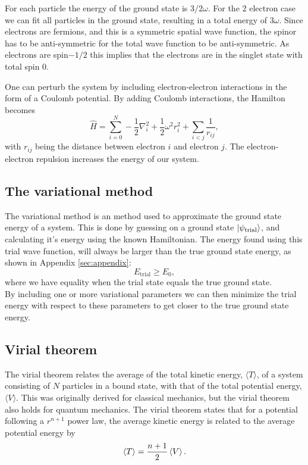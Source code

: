 \documentclass[%
 reprint,
nofootinbib,
aps,
]{revtex4-1}
\begin{document}
For each particle the energy of the ground state is $3/2\omega$. For the $2$ electron case we can fit all particles in the ground state, resulting in a total energy of $3\omega$. Since electrons are fermions, and this is a symmetric spatial wave function, the spinor has to be anti-symmetric for the total wave function to be anti-symmetric. As electrons are spin$-1/2$ this implies that the electrons are in the singlet state with total spin $0$.

One can perturb the system by including electron-electron interactions in the form of a Coulomb potential. By adding Coulomb interactions, the Hamilton becomes
\begin{equation}
  \hat{H} = \sum_{i=0}^{N} -\frac{1}{2}\nabla_i^2 + \frac{1}{2}\omega^2 r_i^2 + \sum_{i<j}\frac{1}{r_{ij}}, \label{hamil_interact}
\end{equation}
with $r_{ij}$ being the distance between electron $i$ and electron $j$. The electron-electron repulsion increases the energy of our system.


\subsection{The variational method}
The variational method is an method used to approximate the ground state energy of a system. This is done by guessing on a ground state $\ket{\psi_{\mathrm{trial}}}$, and calculating it's energy using the known Hamiltonian. The energy found using this trial wave function, will always be larger than the true ground state energy, as shown in Appendix \vref{sec:appendix}:
\begin{equation}\label{eq:variational_method}
  E_{\mathrm{trial}} \geq E_0,
\end{equation}
where we have equality when the trial state equals the true ground state.\\
By including one or more variational parameters we can then minimize the trial energy with respect to these parameters to get closer to the true ground state energy.

\subsection{Virial theorem}\label{sec:virial}
The virial theorem relates the average of the total kinetic energy, $\langle T \rangle$, of a system consisting of $N$ particles in a bound state, with that of the total potential energy, $\langle V \rangle$. This was originally derived for classical mechanics, but the virial theorem also holds for quantum mechanics. The virial theorem states that for a potential following a $r^{n+1}$ power law, the average kinetic energy is related to the average potential energy by \cite{klasmek}
\begin{equation}\label{eq:general_virial}
\ev{T} = \frac{n+1}{2}\ev{V}.
\end{equation}
\end{document}
